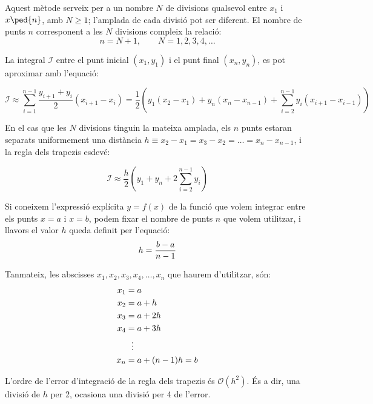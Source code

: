 Aquest mètode serveix per a un nombre  $N$ de divisions qualsevol  entre $x_1$ i $x\ped{n}$, amb $N \geq 1$; l'amplada de cada divisió pot ser diferent.  El nombre de punts $n$ corresponent a les $N$ divisions compleix la relació: 
\begin{equation}
n = N+1, \qquad N = 1, 2, 3, 4, \dots
\end{equation}

La integral $\mathscr{I}$ entre el punt inicial $(x_1, y_1)$ i el punt final $(x_n, y_n)$, es pot aproximar amb l'equació:

 \begin{equation}\label{eq:trap-uneven}
    \mathscr{I} \approx \sum_{i=1}^{n-1} \frac{y_{i+1} + y_i}{2} (x_{i+1}-x_i) =
     \frac{1}{2} \left( y_1(x_2-x_1) + y_n(x_n-x_{n-1}) +
       \sum_{i=2}^{n-1} y_i(x_{i+1}-x_{i-1})\right)
 \end{equation}

En el cas que les $N$ divisions tinguin la mateixa amplada, els  $n$ punts estaran separats uniformement una distància $h \equiv x_2-x_1 = x_3-x_2 = \dots = x_n-x_{n-1}$, i la regla dels trapezis esdevé:

 \begin{equation}\label{eq:trap}
    \mathscr{I} \approx \frac{h}{2} \left( y_1 + y_n + 2 \sum_{i=2}^{n-1} y_i \right)
 \end{equation}

Si coneixem l'expressió explícita $y=f(x)$ de la funció que volem integrar entre els punts $x=a$ i $x=b$, podem fixar el nombre de punts $n$ que volem utilitzar, i llavors el valor $h$ queda definit per l'equació:
\begin{equation}\label{eq:trap_1}
    h = \frac{b-a}{n-1}\\
\end{equation}

Tanmateix, les abscisses $x_1, x_2, x_3,x_4, \dotsc , x_n$ que haurem d'utilitzar, són:
\begin{align}\label{eq:trap_2}
    x_1 &= a \notag\\
    x_2 &= a + h \notag\\
    x_3 &= a + 2 h \notag\\
    x_4 &= a + 3 h\\
    {} &\hspace{1.5ex}\vdots {} \notag\\
    x_n &= a + (n-1)h =b \notag
\end{align}

L'ordre de l'error d'integració de la regla dels trapezis és $\mathscr{O}(h^2)$. És a dir, una divisió de $h$ per 2, ocasiona una divisió per 4 de l'error.

